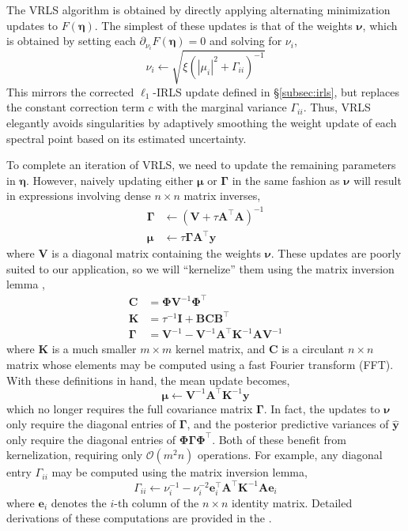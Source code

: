 \documentclass[final,5p,times,twocolumn]{elsarticle}
\newcommand{\m}[1]{\boldsymbol{#1}}
\begin{document}
The VRLS algorithm is obtained by directly applying alternating minimization
updates to $F(\m{\eta})$. The simplest of these updates is that of the
weights $\m{\nu}$, which is obtained by setting each
$\partial_{\nu_i} F(\m{\eta}) = 0$ and solving for $\nu_i$,
\begin{equation}
\label{eq:nu_update}
\nu_i \gets \sqrt{\xi (|\mu_i|^2 + \Gamma_{ii})^{-1}}
\end{equation}
This mirrors the corrected $\ell_1$-IRLS update defined in
\S\ref{subsec:irls}, but replaces the constant correction term $c$ with
the marginal variance $\Gamma_{ii}$. Thus, VRLS elegantly avoids singularities
by adaptively smoothing the weight update of each spectral point based on its
estimated uncertainty.

To complete an iteration of VRLS, we need to update the remaining parameters
in $\m{\eta}$. However, naively updating either $\m{\mu}$ or $\m{\Gamma}$ in
the same fashion as $\m{\nu}$ will result in expressions involving dense
$n \times n$ matrix inverses,
\begin{equation}
\begin{aligned}
\m{\Gamma} &\gets (\m{V} + \tau \m{A}^\top \m{A})^{-1}
\\
\m{\mu} &\gets \tau \m{\Gamma} \m{A}^\top \m{y}
\end{aligned}
\end{equation}
where $\m{V}$ is a diagonal matrix containing the weights $\m{\nu}$. These
updates are poorly suited to our application, so we will ``kernelize'' them
using the matrix inversion lemma \cite{boyd2004},
\begin{align}
\m{C} &= \m{\Phi} \m{V}^{-1} \m{\Phi}^\top
\\
\label{eq:kernel_update}
\m{K} &= \tau^{-1} \m{I} + \m{B} \m{C} \m{B}^\top
\\
\m{\Gamma} &= \m{V}^{-1} - \m{V}^{-1} \m{A}^\top \m{K}^{-1} \m{A} \m{V}^{-1}
\end{align}
where $\m{K}$ is a much smaller $m \times m$ kernel matrix, and $\m{C}$
is a circulant $n \times n$ matrix whose elements may be computed using a
fast Fourier transform (FFT). With these definitions in hand, the mean
update becomes,
\begin{equation}
\label{eq:mu_update}
\m{\mu} \gets \m{V}^{-1} \m{A}^\top \m{K}^{-1} \m{y}
\end{equation}
which no longer requires the full covariance matrix $\m{\Gamma}$. In fact,
the updates to $\m{\nu}$ only require the diagonal entries of $\m{\Gamma}$,
and the posterior predictive variances of $\m{\hat y}$ only require the
diagonal entries of $\m{\Phi} \m{\Gamma} \m{\Phi}^\top$. Both of these
benefit from kernelization, requiring only $\mathcal{O}(m^2 n)$ operations.
For example, any diagonal entry $\Gamma_{ii}$ may be computed using the
matrix inversion lemma,
\begin{equation}
\label{eq:gamma_update}
\Gamma_{ii} \gets
 \nu_i^{-1} - \nu_i^{-2} \m{e}_i^\top \m{A}^\top \m{K}^{-1} \m{A} \m{e}_i
\end{equation}
where $\m{e}_i$ denotes the $i$-th column of the $n \times n$ identity
matrix. Detailed derivations of these computations are provided in the
.
\end{document}

